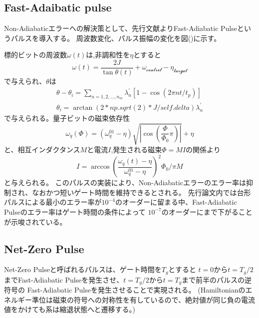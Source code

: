     \subsection{Fast-Adaibatic pulse}
    Non-Adiabaticエラーへの解決策として、先行文献{}よりFast-Adiabatic Pulseというパルスを導入する。
    周波数変化、パルス振幅の変化を図()に示す。

    標的ビットの周波数$\omega(t)$は,非調和性を$\eta$とすると
    \begin{equation}
        \omega(t) = \frac{2J}{\tan \theta(t)}+\omega_{\mathcal{control}}-\eta_{\mathcal{target}}
    \end{equation}
    で与えられ、$\theta$は
    \begin{equation}
        \begin{aligned}
            \theta-\theta_{i}=\sum_{n=1,2, \ldots, n_{m}} \lambda_{n}^{\prime}\left[1-\cos \left(2 \pi n t / t_{p}\right)\right]\\
            \theta_i = \arctan(2*np.sqrt(2)*J/self.delta)
            \lambda_{n}^{\prime}
        \end{aligned}
    \end{equation}
    で与えられる。量子ビットの磁束依存性
    \begin{equation}
        \omega_{q}(\Phi)=\left(\omega_{q}^{01}-\eta\right) \sqrt{\left|\cos \left(\frac{\Phi}{\Phi_{0}} \pi\right)\right|}+\eta
    \end{equation}
    と、相互インダクタンス$M$と電流$I$,発生される磁束$\Phi=MI$の関係より
    \begin{equation}
        I = \arccos{\left(\frac{\omega_{q}(t)-\eta}{\omega_{q}^{01}-\eta}\right)^2}\Phi_0/\pi M
    \end{equation}
    と与えられる。
    このパルスの実装により、Non-Adiabaticエラーのエラー率は抑制され、なおかつ短いゲート時間を維持できるとされる。
    先行論文内では台形パルスによる最小のエラー率が$10^{-4}$のオーダーに留まる中、Fast-Adiabatic Pulseのエラー率はゲート時間の条件によって
    $10^{-7}$のオーダーにまで下がることが示唆されている。


    \subsection{Net-Zero Pulse}
    Net-Zero Pulseと呼ばれるパルスは、ゲート時間を$T_g$とすると
    $t=0$から$t=T_g/2$までFast-Adiabatic Pulseを発生させ、$t=T_g/2$から$t=T_g$まで前半のパルスの逆符号の
    Fast-Adiabatic Pulseを発生させることで実現される。
    (Hamiltonianのエネルギー準位は磁束の符号への対称性を有しているので、絶対値が同じ負の電流値をかけても系は縮退状態へと遷移する。)




        
        